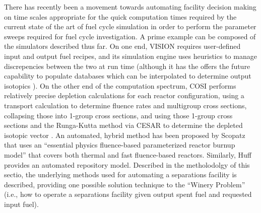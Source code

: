 There has recently been a movement towards automating facility decision making
on time scales appropriate for the quick computation times required by the
current state of the art of fuel cycle simulation in order to perform the
parameter sweeps required for fuel cycle investigation. A prime example can be
composed of the simulators described thus far. On one end, VISION requires
user-defined input and output fuel recipes, and its simulation engine uses
heuristics to manage discrepencies between the two at run time (although it has
the offers the future capability to populate databases which can be interpolated
to determine output isotopics \cite{jacobson_verifiable_2010}). On the other end
of the computation spectrum, COSI performs relatively precise depletion
calculations for each reactor configuration, using a transport calculation to
determine fluence rates and multigroup cross sections, collapsing those into
1-group cross sections, and using those 1-group cross sections and the
Runga-Kutta method via CESAR to determine the depleted isotopic
vector \cite{meyer_new_2009}. An automated, hybrid method has been proposed by
Scopatz that uses an ``essential physics fluence-based parameterized reactor
burnup model''\cite{scopatz_essential_2011} that covers both thermal and fast
fluence-based reactors. Similarly, Huff provides an automated repository
model. Described in the metholodolgy of this sectio, the underlying methods used
for automating a separations facility is described, providing one possible
solution technique to the ``Winery Problem'' (i.e., how to operate a separations
facility given output spent fuel and requested input fuel).

